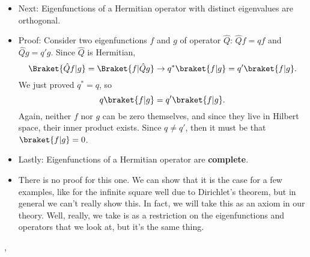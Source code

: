 \begin{itemize}
    \item Next: Eigenfunctions of a Hermitian operator with distinct eigenvalues are orthogonal.
    \item Proof: Consider two eigenfunctions $f$ and $g$ of operator $\hat{Q}$: $\hat{Q}f = qf$ and $\hat{Q}g = q'g$. Since $\hat{Q}$ is Hermitian,
        \begin{equation*}
            \Braket{\hat{Q}f|g} = \Braket{f|\hat{Q}g} \rightarrow q^*\braket{f|g} = q'\braket{f|g}.
        \end{equation*}
        We just proved $q^*=q$, so
        \begin{equation*}
            q\braket{f|g} = q'\braket{f|g}.
        \end{equation*}
        Again, neither $f$ nor $g$ can be zero themselves, and since they live in Hilbert space, their inner product exists. Since $q \neq q'$, then it must be that $\braket{f|g}=0$.
    \item Lastly: Eigenfunctions of a Hermitian operator are \textbf{complete}.
    \item There is no proof for this one. We can show that it is the case for a few examples, like for the infinite square well due to Dirichlet's theorem, but in general we can't really show this. In fact, we will take this as an axiom in our theory. Well, really, we take is as a restriction on the eigenfunctions and operators that we look at, but it's the same thing.
\end{itemize}


\sep



